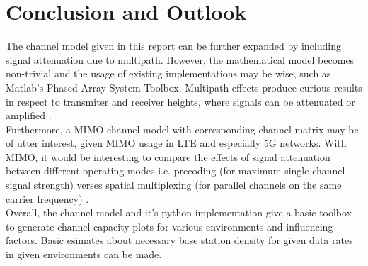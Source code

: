 \graphicspath{{figures/}}



\chapter{Conclusion and Outlook}\label{chap:conclusion_outlook}

The channel model given in this report can be further expanded by including signal attenuation
due to multipath. However, the mathematical model becomes non-trivial and the usage of existing
implementations may be wise, such as Matlab's Phased Array System Toolbox. Multipath effects 
produce curious results in respect to transmiter and receiver heights, where signals can be attenuated
or amplified \cite{matlab-rf}. \\
Furthermore, a MIMO channel model with corresponding channel matrix may be of utter interest, given 
MIMO usage in LTE and especially 5G networks. With MIMO, it would be interesting to compare the effects 
of signal attenuation between different operating modes i.e. precoding (for maximum single channel signal strength)
verses spatial multiplexing (for parallel channels on the same carrier frequency) \cite{tse2005fundamentals}. \\
Overall, the channel model and it's python implementation give a basic toolbox to generate
channel capacity plots for various environments and influencing factors. Basic esimates about 
necessary base station density for given data rates in given environments can be made. 

